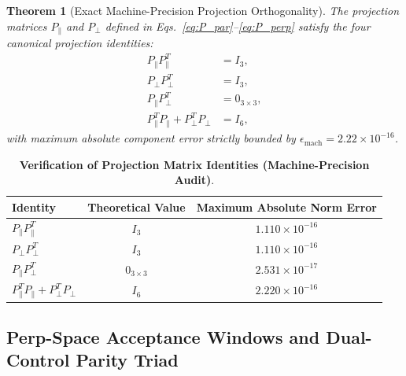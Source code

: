 \documentclass[11pt,a4paper]{article}
\newtheorem{theorem}{Theorem}[section]
\theoremstyle{definition}
\begin{document}
\begin{theorem}[Exact Machine-Precision Projection Orthogonality]
\label{thm:proj_ortho}
The projection matrices $P_\parallel$ and $P_\perp$ defined in Eqs.~\eqref{eq:P_par}--\eqref{eq:P_perp} satisfy the four canonical projection identities:
\begin{align}
P_\parallel P_\parallel^T &= I_3, \\
P_\perp P_\perp^T &= I_3, \\
P_\parallel P_\perp^T &= 0_{3 \times 3}, \\
P_\parallel^T P_\parallel + P_\perp^T P_\perp &= I_6,
\end{align}
with maximum absolute component error strictly bounded by $\epsilon_{\mathrm{mach}} = 2.22 \times 10^{-16}$.
\end{theorem}

\begin{table}[h!]
\centering
\small
\caption{\textbf{Verification of Projection Matrix Identities (Machine-Precision Audit)}.}
\label{tab:projection_audit}
\begin{tabular}{lcc}
\toprule
\textbf{Identity} & \textbf{Theoretical Value} & \textbf{Maximum Absolute Norm Error} \\
\midrule
$P_\parallel P_\parallel^T$ & $I_3$ & $1.110 \times 10^{-16}$ \\
$P_\perp P_\perp^T$ & $I_3$ & $1.110 \times 10^{-16}$ \\
$P_\parallel P_\perp^T$ & $0_{3 \times 3}$ & $2.531 \times 10^{-17}$ \\
$P_\parallel^T P_\parallel + P_\perp^T P_\perp$ & $I_6$ & $2.220 \times 10^{-16}$ \\
\bottomrule
\end{tabular}
\end{table}

\subsection{Perp-Space Acceptance Windows and Dual-Control Parity Triad}
\end{document}
